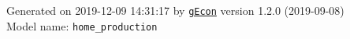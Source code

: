 \documentclass[10pt,a4paper]{article}
\numberwithin{equation}{section}
\begin{document}
\begin{landscape}
\begin{flushleft}{\large
Generated  on 2019-12-09 14:31:17 by \href{http://gecon.r-forge.r-project.org/}{\texttt{gEcon}} version 1.2.0 (2019-09-08)\\
Model name: \verb+home_production+
}\end{flushleft}


\end{landscape}

\end{document}

